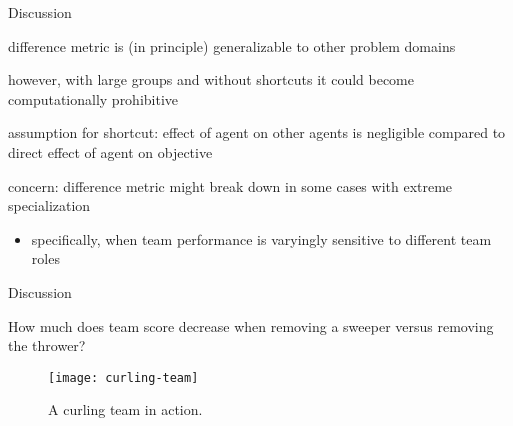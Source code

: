 %
%
%
%

\begin{frame}{Discussion}

difference metric is (in principle) generalizable to other problem domains

however, with large groups and without shortcuts it could become computationally prohibitive

assumption for shortcut:
effect of agent on other agents is negligible compared to direct effect of agent on objective

concern:
difference metric might break down in some cases with extreme specialization
\begin{itemize}
\item specifically, when team performance is varyingly sensitive to different team roles
\end{itemize}


\end{frame}

\begin{frame}{Discussion}

How much does team score decrease when removing a sweeper versus removing the thrower?

\begin{figure}
\texttt{[image: curling-team]}
\caption{A curling team in action.}
\label{fig:curling-team}
\end{figure}

\end{frame}
